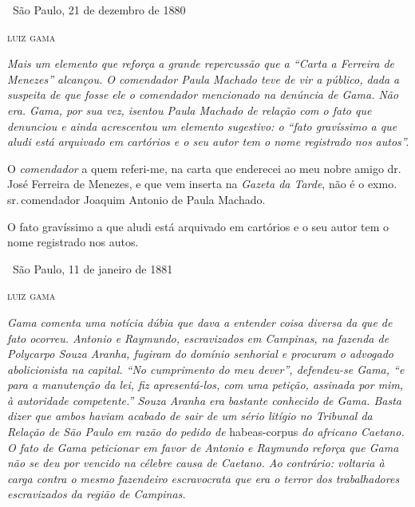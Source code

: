 \noindent\dotfill\medskip

\hfill\ São Paulo, 21 de dezembro de 1880

\hfill\textsc{luiz gama}


\begin{resumo}
\emph{Mais um elemento que reforça a grande repercussão que a ``Carta a
Ferreira de Menezes'' alcançou. O comendador Paula Machado teve de
vir a público, dada a suspeita de que fosse ele o comendador mencionado
na denúncia de Gama. Não era. Gama, por sua vez, isentou Paula Machado
de relação com o fato que denunciou e ainda acrescentou um elemento
sugestivo: o ``fato gravíssimo a que aludi está arquivado em cartórios e
o seu autor tem o nome registrado nos autos''. }
\end{resumo}

O \emph{comendador} a quem referi-me, na carta que enderecei ao meu
nobre amigo dr.\,José Ferreira de Menezes, e que vem inserta na
\emph{Gazeta da Tarde}, não é o exmo.\,sr.\,comendador Joaquim Antonio de
Paula Machado.

O fato gravíssimo a que aludi está arquivado em cartórios e o seu autor
tem o nome registrado nos autos.

\medskip

\hfill\ São Paulo, 11 de janeiro de 1881

\hfill\textsc{luiz gama}


\begin{resumo}
\emph{Gama comenta uma notícia dúbia que dava a entender coisa diversa
da que de fato ocorreu. Antonio e Raymundo, escravizados em Campinas, na
fazenda de Polycarpo Souza Aranha, fugiram do domínio senhorial e
procuram o advogado abolicionista na capital. ``No cumprimento do meu
dever'', defendeu-se Gama, ``e para a manutenção da lei, fiz
apresentá-los, com uma petição, assinada por mim, à autoridade
competente.'' Souza Aranha era bastante conhecido de Gama. Basta dizer
que ambos haviam acabado de sair de um sério litígio no Tribunal da
Relação de São Paulo em razão do pedido de} habeas-corpus \emph{do
africano Caetano. O fato de Gama peticionar em favor de Antonio e
Raymundo reforça que Gama não se deu por vencido na célebre causa de
Caetano. Ao contrário: voltaria à carga contra o mesmo fazendeiro
escravocrata que era o terror dos trabalhadores escravizados da região
de Campinas. }
\end{resumo}


